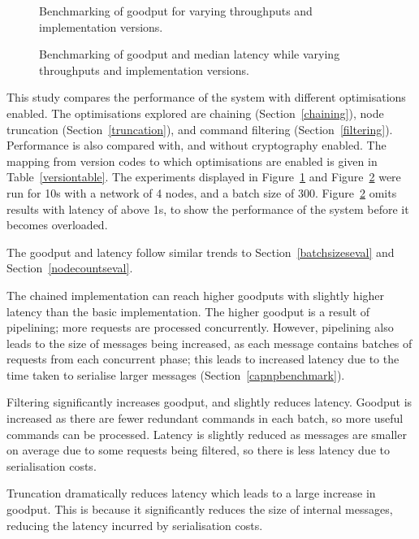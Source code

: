\begin{figure}[h!]
\centering
\resizebox{.6\textwidth}{!}{}
\caption{Benchmarking of goodput for varying throughputs and implementation versions.}
\label{throughputgoodputablation}
\end{figure}

\begin{figure}[h!]
\centering
\resizebox{.6\textwidth}{!}{}
\caption{Benchmarking of goodput and median latency while varying throughputs and implementation versions.}
\label{goodputlatencablation}
\end{figure}

This study compares the performance of the system with different optimisations enabled. The optimisations explored are chaining (Section~\ref{chaining}), node truncation (Section~\ref{truncation}), and command filtering (Section~\ref{filtering}). Performance is also compared with, and without cryptography enabled. The mapping from version codes to which optimisations are enabled is given in Table~\ref{versiontable}. The experiments displayed in Figure~\ref{throughputgoodputablation} and Figure~\ref{goodputlatencablation} were run for 10s with a network of 4 nodes, and a batch size of 300. Figure~\ref{goodputlatencablation} omits results with latency of above 1s, to show the performance of the system before it becomes overloaded.

The goodput and latency follow similar trends to Section~\ref{batchsizeseval} and Section~\ref{nodecountseval}.

The chained implementation can reach higher goodputs with slightly higher latency than the basic implementation. The higher goodput is a result of pipelining; more requests are processed concurrently. However, pipelining also leads to the size of messages being increased, as each message contains batches of requests from each concurrent phase; this leads to increased latency due to the time taken to serialise larger messages (Section~\ref{capnpbenchmark}).

Filtering significantly increases goodput, and slightly reduces latency. Goodput is increased as there are fewer redundant commands in each batch, so more useful commands can be processed. Latency is slightly reduced as messages are smaller on average due to some requests being filtered, so there is less latency due to serialisation costs.

Truncation dramatically reduces latency which leads to a large increase in goodput. This is because it significantly reduces the size of internal messages, reducing the latency incurred by serialisation costs.


